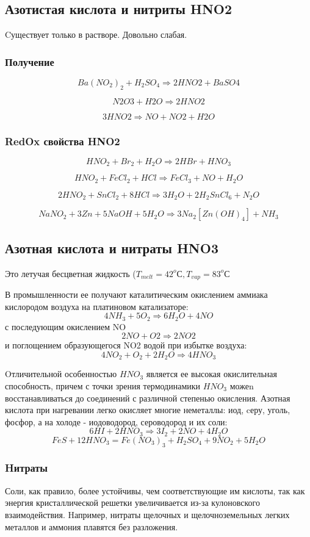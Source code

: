 \documentclass[11pt]{article}
\begin{document}
\subsection{Азотистая кислота и нитриты HNO2}

Cуществует только в растворе. Довольно слабая.
\subsubsection{Получение}
$$Ba(NO_2 )_2 + H_2SO_4 \Rightarrow  2HNO2 + BaSO4$$

$$N2O3 + H2O \Rightarrow 2HNO2$$

$$3HNO2 \Rightarrow NO + NO2 + H2O$$

\subsubsection{RedOx свойства HNO2}

$$HNO_2 + Br_2 + H_2O \Rightarrow 2HBr + HNO_3$$

$$HNO_2 + FeCl_2 + HCl \Rightarrow FeCl_3 + NO + H_2O$$

$$2HNO_2 + SnCl_2 + 8HCl \Rightarrow 3H_2O + 2H_2SnCl_6 + N_2O$$

$$NaNO_2 + 3Zn + 5NaOH + 5H_2O \Rightarrow 3Na_2[Zn(OH)_4] + NH_3$$

\subsection{Азотная кислота и нитраты HNO3}

Это летучая бесцветная жидкость ($T_{melt} =42 ^oС, T_{vap} = 83 ^oС$

В промышленности ее получают каталитическим окислением аммиака
кислородом воздуха на платиновом катализаторе:
$$4NH_3 + 5O_2 \Rightarrow 6H_2O + 4NO$$
с последующим окислением NO
$$2NO + O2 \Rightarrow 2NO2$$
и поглощением образующегося NO2 водой при избытке воздуха:
$$4NO_2 + O_2 + 2H_2O \Rightarrow 4HNO_3$$

Oтличительной особенностью $HNO_3$ является ее высокая окислительная
способность, причем с точки зрения термодинамики $HNO_3$ можеn
восстанавливаться до соединений с различной степенью окисления.
Азотная кислота при нагревании легко окисляет многие неметаллы: иод,
cеру, уголь, фосфор, а на холоде - иодоводород, сероводород и их соли:
$$6HI + 2HNO_3 \Rightarrow 3I_2 + 2NO + 4H_2O$$
$$FeS + 12HNO_3 = Fe(NO_3 )_3 + H_2SO_4 + 9NO_2 + 5H_2O$$

\subsubsection{Hитраты}
Соли, как правило, более устойчивы, чем соответствующие им
кислоты, так как энергия кристаллической решетки увеличивается из-за
кулоновского взаимодействия. 
Hапример, нитраты щелочных и
щелочноземельных легких металлов и аммония плавятся без разложения.
\end{document}
